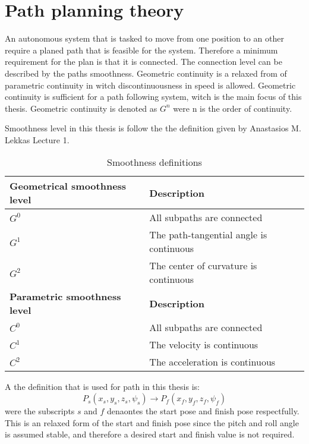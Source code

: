 \chapter{Path planning theory}
An autonomous system that is tasked to move from one position to an other require a planed path that is feasible for the system. Therefore a minimum requirement for the plan is that it is connected. The connection level can be described by the paths smoothness. Geometric continuity is a relaxed from of parametric continuity in witch discontinuousness in speed is allowed. Geometric continuity is sufficient for a path following system, witch is the main focus of this thesis. Geometric continuity is denoted as $G^n$ were n is the order of continuity.

Smoothness level in this thesis is follow the the definition given by Anastasios M. Lekkas Lecture 1.

\begin{table}[H]
\begin{center}
\begin{tabular}{| l | | l |}
\hline
\textbf{Geometrical smoothness level} & \textbf{Description} \\ \hline
$G^0$ & All subpaths are connected \\ \hline
$G^1$ & The path-tangential angle is continuous \\ \hline
$G^2$ & The center of curvature is continuous \\ \hline
\textbf{Parametric smoothness level} & \textbf{Description} \\ \hline
$C^0$ & All subpaths are connected \\ \hline
$C^1$ & The velocity is continuous \\ \hline
$C^2$ & The acceleration is continuous \\ \hline
\end{tabular}
\end{center}
\caption{Smoothness definitions}
\label{TB:SmoothnessDescriptions}
\end{table} 

A the definition that is used for path in this thesis is:
\begin{equation}
P_s(x_s,y_s,z_s,\psi_s) \rightarrow P_f(x_f,y_f,z_f,\psi_f)
\end{equation}
were the subscripts $s$ and $f$ denaontes the start pose and finish pose respectfully. This is an relaxed form of the start and finish pose since the pitch and roll angle is assumed stable, and therefore a desired start and finish value is not required.

